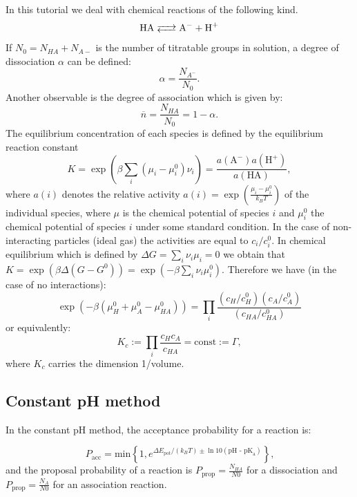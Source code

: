 \documentclass[
a4paper,                        %
11pt,                           %
twoside,                        %
footsepline,                    %
headsepline,                    %
headexclude,                    %
footexclude,                    %
pagesize,                       %
]{scrartcl}
\begin{document}
In this tutorial we deal with chemical reactions of the following kind.
\begin{equation}\label{disso}
\ce{HA <--> A- + H+}
\end{equation}
If $N_0 = N_{HA} + N_{A-}$ is the number of titratable groups in solution, a degree of dissociation $\alpha$ can be defined:
\begin{equation}\label{alpha}
\alpha = \frac{N_{A^-}}{N_0}.
\end{equation}
Another observable is the degree of association which is given by:
\begin{equation*}
\overline{n}=\frac{N_{HA}}{N_0}=1-\alpha.
\end{equation*}
The equilibrium concentration of each species is defined by the equilibrium reaction constant
\begin{equation}
K =\exp(\beta \sum_i (\mu_i-\mu_i^0) \nu_i)= \frac{a(\text{A}^-)a(\text{H}^+)}{a(\text{HA})},
\end{equation}
where $a(i)$ denotes the relative activity $a(i)=\exp(\frac{\mu_i-\mu_i^0}{k_BT})$ of the individual species, where $\mu$ is the chemical potential of species $i$ and $\mu_i^0$ the chemical potential of species $i$ under some standard condition. In the case of non-interacting particles (ideal gas) the activities are equal to $c_i/c_i^0$. In chemical equilibrium which is defined by $\Delta G=\sum_i \nu_i \mu_i=0$ we obtain that $K=\exp(\beta \Delta (G-G^0))=\exp(-\beta \sum_i \nu_i \mu_i^0)$.
Therefore we have (in the case of no interactions):
\begin{equation}
\exp(-\beta ( \mu_H^0+\mu_A^0-\mu_{HA}^0))=\prod_i \frac{(c_{H}/c^0_H)(c_{A}/c^0_A)}{(c_{HA}/c^0_{HA})}
\end{equation}
or equivalently:
\begin{equation}
K_c:=\prod_i \frac{c_{H}c_{A}}{c_{HA}}=\text{const}:=\Gamma,
\end{equation}
where $K_c$ carries the dimension 1/volume.


\subsection{Constant pH method}

In the constant pH method, the acceptance probability for a reaction is:

\begin{equation} 
P_{\text{acc}} = \text{min}\left\lbrace  1, e^{\Delta E_\text{pot}/(k_BT) \pm \ln{10} (\text{pH - pK}_\text{a})}\right\rbrace  \text{,}
\end{equation}
and the proposal probability of a reaction is $P_\text{prop}=\frac{N_{HA}}{N0}$ for a dissociation and $P_\text{prop}=\frac{N_{A}}{N0}$ for an association reaction\cite{landsgesell2017simulation}.
 
\end{document}
